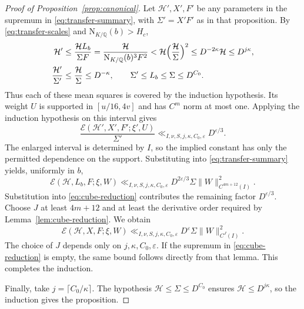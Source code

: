 \documentclass[11pt,a4paper]{article}
\numberwithin{equation}{section}
\numberwithin{figure}{section}
\theoremstyle{definition}
\theoremstyle{remark}
\newcommand{\Q}{\mathbb Q}
\newcommand{\NK}{\mathrm N_{K/\Q}}
\newcommand{\E}{\mathcal E}
\begin{document}
\begin{proof}[Proof of Proposition~\ref{prop:canonical}]
Let $\mathcal H',X',F'$ be any parameters in the supremum in
\eqref{eq:transfer-summary}, with $\Sigma'=X'F'$ as in that proposition.
By \eqref{eq:transfer-scales} and $\NK(b)>H_c$,
\[
 \begin{aligned}
 \mathcal H'
 &\le\frac{\mathcal H L_b}{\Sigma F}
 =\frac{\mathcal H}{\NK(b)^3F^2}
 <\mathcal H\Bigl(\frac{\mathcal H}{\Sigma}\Bigr)^2
 \le D^{-2\kappa}\mathcal H\le D^{j\kappa},\\
 \frac{\mathcal H'}{\Sigma'}
 &\le\frac{\mathcal H}{\Sigma}\le D^{-\kappa},
 \qquad \Sigma'\le L_b\le\Sigma\le D^{C_0}.
 \end{aligned}
\]
Thus each of these mean squares is covered by the induction hypothesis.
Its weight $U$ is supported in $[u/16,4v]$ and has $C^m$ norm at most one.
Applying the induction hypothesis on this interval gives
\[
 \frac{\E(\mathcal H',X',F';\xi',U)}{\Sigma'}
 \ll_{I,\nu,S,j,\kappa,C_0,\varepsilon}D^{\varepsilon/3}.
\]
The enlarged interval is determined by $I$, so the implied constant
has only the permitted dependence on the support.
Substituting into \eqref{eq:transfer-summary} yields, uniformly in $b$,
\[
 \E(\mathcal H,L_b,F;\xi,W)
 \ll_{I,\nu,S,j,\kappa,C_0,\varepsilon}
 D^{2\varepsilon/3}\Sigma\|W\|_{C^{4m+12}(I)}^2.
\]
Substitution into \eqref{eq:cube-reduction} contributes the remaining
factor $D^{\varepsilon/3}$. Choose $J$ at least $4m+12$ and at least
the derivative order required by Lemma~\ref{lem:cube-reduction}.
We obtain
\[
 \E(\mathcal H,X,F;\xi,W)
 \ll_{I,\nu,S,j,\kappa,C_0,\varepsilon}
 D^\varepsilon\Sigma\|W\|_{C^J(I)}^2.
\]
The choice of $J$ depends only on $j,\kappa,C_0,\varepsilon$.
If the supremum in \eqref{eq:cube-reduction} is empty, the same bound
follows directly from that lemma. This completes the induction.

Finally, take $j=\lceil C_0/\kappa\rceil$.
The hypothesis $\mathcal H\le\Sigma\le D^{C_0}$ ensures
$\mathcal H\le D^{j\kappa}$, so the induction gives the proposition.
\end{proof}
\end{document}
